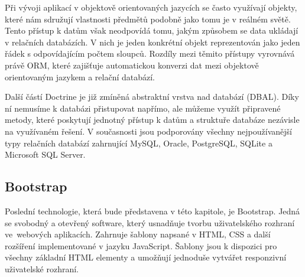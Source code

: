 Při vývoji aplikací v objektově orientovaných jazycích se často využívají objekty, které nám sdružují vlastnosti předmětů podobně jako tomu je v reálném světě. Tento přístup k datům však neodpovídá tomu, jakým způsobem se data ukládají v relačních databázích. V nich je jeden konkrétní objekt reprezentován jako jeden řádek s odpovídajícím počtem sloupců. Rozdíly mezi těmito přístupy vyrovnává právě ORM, které zajišťuje automatickou konverzi dat mezi objektově orientovaným jazykem a relační databází. \cite{doctrine_orm}

Další částí Doctrine je již zmíněná abstraktní vrstva nad databází (DBAL). Díky ní nemusíme k databázi přistupovat napřímo, ale můžeme využít připravené metody, které poskytují jednotný přístup k datům a struktuře databáze nezávisle na využívaném řešení. V současnosti jsou podporovány všechny nejpoužívanější typy relačních databází zahrnující MySQL, Oracle, PostgreSQL, SQLite a Microsoft SQL Server. \cite{doctrine_dbal}

\subsection{Bootstrap}
Poslední technologie, která bude představena v této kapitole, je Bootstrap. Jedná se svobodný a otevřený software, který usnadňuje tvorbu uživatelského rozhraní ve~webových aplikacích. Zahrnuje šablony napsané v HTML, CSS a další rozšíření implementované v jazyku JavaScript. Šablony jsou k dispozici pro všechny základní HTML elementy a umožňují jednoduše vytvářet responzivní uživatelské rozhraní. \cite{bootstrap}
